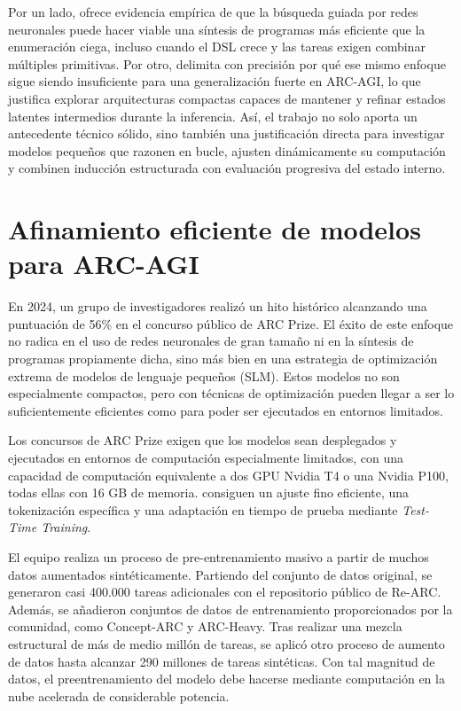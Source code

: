 \documentclass[11pt,a4paper,spanish]{book}
\numberwithin{equation}{chapter}
\numberwithin{figure}{chapter}
\begin{document}
Por un lado,  ofrece evidencia empírica de que la 
búsqueda guiada por redes neuronales puede hacer viable una síntesis de programas más eficiente que la enumeración ciega, incluso cuando el DSL 
crece y las tareas exigen combinar múltiples primitivas. Por otro, delimita con precisión por qué ese mismo enfoque sigue siendo insuficiente 
para una generalización fuerte en ARC-AGI, lo que justifica explorar arquitecturas compactas capaces de mantener y refinar estados latentes 
intermedios durante la inferencia. Así, el trabajo no solo aporta un antecedente técnico sólido, sino también una justificación directa para 
investigar modelos pequeños que razonen en bucle, ajusten dinámicamente su computación y combinen inducción estructurada con evaluación progresiva 
del estado interno.



\section{Afinamiento eficiente de modelos para ARC-AGI}

En 2024, un grupo de investigadores realizó un hito histórico alcanzando una puntuación de 56\% en el concurso público de ARC Prize. El éxito de este enfoque 
no radica en el uso de redes neuronales de gran tamaño ni en la síntesis de programas propiamente dicha, sino más bien en una estrategia
de optimización extrema de modelos de lenguaje pequeños (SLM). Estos modelos no son especialmente compactos, pero con técnicas
de optimización pueden llegar a ser lo suficientemente eficientes como para poder ser ejecutados en entornos limitados.

Los concursos de ARC Prize exigen que los modelos sean desplegados y ejecutados en entornos de computación especialmente limitados, con
una capacidad de computación equivalente a dos GPU Nvidia T4 o una Nvidia P100, todas ellas con 16 GB de memoria.  
consiguen un ajuste fino eficiente, una tokenización específica y una adaptación en tiempo de prueba mediante \textit{Test-Time Training}.

El equipo realiza un proceso de pre-entrenamiento masivo a partir de muchos datos aumentados sintéticamente. Partiendo del conjunto de datos original,
se generaron casi 400.000 tareas adicionales con el repositorio público de Re-ARC. Además, se añadieron conjuntos de datos de 
entrenamiento proporcionados por la comunidad, como Concept-ARC y ARC-Heavy. Tras realizar una mezcla estructural de más de medio millón
de tareas, se aplicó otro proceso de aumento de datos hasta alcanzar 290 millones de tareas sintéticas. Con tal magnitud de datos, el preentrenamiento del
modelo debe hacerse mediante computación en la nube acelerada de considerable potencia.
\end{document}
